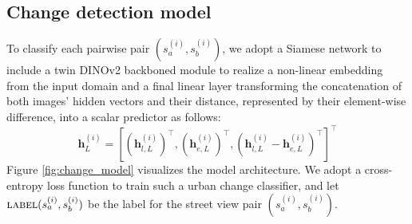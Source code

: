 \documentclass[letterpaper]{article} %
\begin{document}
\subsection{Change detection model}
To classify each pairwise pair $(s_a^{(i)},s_b^{(i)})$, we adopt a Siamese network to include a twin DINOv2 \cite{Oquab2023DINOv2LR} backboned module to realize a non-linear embedding from the input domain and a final linear layer transforming the concatenation of both images' hidden vectors and their distance, represented by their element-wise difference, into a scalar predictor as follows:
\begin{equation} \label{eq: sia_concat}
\mathbf{h}^{(i)}_{L} = \left[(\mathbf{h}^{(i)}_{l, L})^\top, (\mathbf{h}^{(i)}_{e, L})^\top, (\mathbf{h}^{(i)}_{l, L}-\mathbf{h}^{(i)}_{e, L})^{\top}\right]^{\top}
\end{equation}
Figure \ref{fig:change_model} visualizes the model architecture. We adopt a cross-entropy loss function to train such a urban change classifier, and let $\textsc{label}{(s_a^{(i)},s_b^{(i)})}$ be the label for the street view pair $(s_a^{(i)},s_b^{(i)})$.

\end{document}
